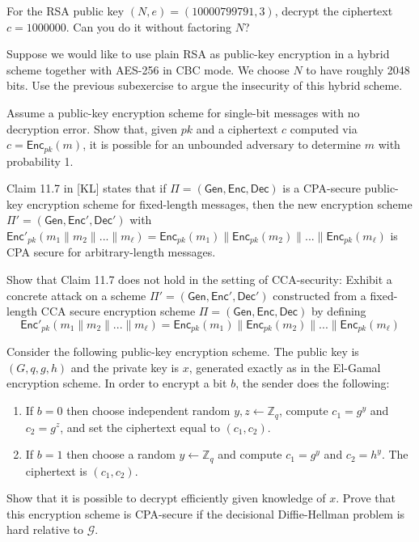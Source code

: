 \documentclass[a4paper,10pt,landscape,twocolumn]{scrartcl}
\begin{document}
\begin{exercise}
\begin{subex}
For the RSA public key $(N,e)=(10000799791, 3)$, decrypt the ciphertext $c=1 000 000$. Can you do it without factoring $N$?
\end{subex}
\begin{subex}
Suppose we would like to use plain RSA as public-key encryption in a hybrid scheme together with AES-256 in CBC mode. We choose $N$ to have roughly 2048 bits. Use the previous subexercise to argue the insecurity of this hybrid scheme.
\end{subex}
\end{exercise}


\begin{exercise}
	Assume a public-key encryption scheme for single-bit messages with no
	decryption error. Show that, given $pk$ and a ciphertext $c$ computed via
	$c=\mathsf{Enc}_{pk}(m)$, it is possible for an unbounded adversary to determine
	$m$ with probability 1.
\end{exercise}

	
\pagebreak
\begin{exercise}
Claim 11.7 in [KL] states that if $\Pi=(\mathsf{Gen},\mathsf{Enc}, \mathsf{Dec})$ is a CPA-secure public-key encryption scheme for fixed-length messages, then the new encryption scheme $\Pi'=(\mathsf{Gen},\mathsf{Enc}', \mathsf{Dec}')$ with  $\mathsf{Enc}'_{pk}(m_1\|m_2\|...\|m_\ell)=\mathsf{Enc}_{pk}(m_1)\|\mathsf{Enc}_{pk}(m_2)\|...\|\mathsf{Enc}_{pk}(m_\ell)$ is CPA secure for arbitrary-length messages.

	Show that Claim 11.7 does not hold in the setting of CCA-security: Exhibit a concrete attack on a scheme $\Pi'=(\mathsf{Gen},\mathsf{Enc}', \mathsf{Dec}')$ constructed from a fixed-length CCA secure encryption scheme $\Pi=(\mathsf{Gen},\mathsf{Enc}, \mathsf{Dec})$ by defining 
\[ \mathsf{Enc}'_{pk}(m_1\|m_2\|...\|m_\ell)=\mathsf{Enc}_{pk}(m_1)\|\mathsf{Enc}_{pk}(m_2)\|...\|\mathsf{Enc}_{pk}(m_\ell) \]
\end{exercise}




\begin{bonusexercise}
	Consider the following public-key encryption scheme. The public key is $(G,q,g,h)$ and the private key is $x$, generated exactly as in the El-Gamal encryption scheme. In order to encrypt a bit $b$, the sender does the following:
	\begin{enumerate}
		\item If $b=0$ then choose independent random $y,z \leftarrow \mathbb{Z}_q$, compute $c_1 = g^y$ and $c_2 = g^z$, and set the ciphertext equal to $(c_1, c_2)$.
		\item If $b = 1$ then choose a random $y\leftarrow \mathbb{Z}_q$ and compute $c_1 =g^y$ and $c_2 = h^y$. The ciphertext is $(c_1, c_2)$.
	\end{enumerate}
	Show that it is possible to decrypt efficiently given knowledge of $x$. Prove that this encryption scheme is CPA-secure if the decisional Diffie-Hellman problem is hard relative to $\mathcal{G}$.
\end{bonusexercise}
\end{document}
